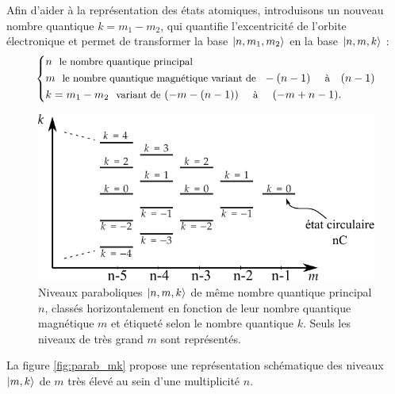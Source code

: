 Afin d'aider à la représentation des états atomiques, introduisons un nouveau nombre quantique $k=m_1-m_2$, qui quantifie l'excentricité de l'orbite électronique et permet de transformer la base $\ket{n,m_1,m_2}$ en la base $\ket{n,m,k}$ :
\begin{equation}\label{eq:base_nmk}
\left\{
\begin{aligned}
&n \text{ \begin{small}
le nombre quantique principal
\end{small}}\\
&m \text{ \begin{small}
le nombre quantique magnétique variant de
\end{small} }
-(n-1)~~ \text{ \begin{small} à \end{small}} ~~(n-1)\\
&k=m_1-m_2 \text{ \begin{small} variant de\end{small} } (-m-(n-1))~~ \text{ \begin{small} à \end{small} } ~~(-m+n-1).
\end{aligned} \right.
\end{equation}
%


\begin{figure}[!h]
\centering
\includegraphics[width=.7\linewidth]{figures/echelle_parabolique_mk}
\caption[Échelle des niveaux paraboliques $\ket{n,m,k}$]{
Niveaux paraboliques $\ket{n,m,k}$ de même nombre quantique principal $n$, classés horizontalement en fonction de leur nombre quantique magnétique $m$ et étiqueté selon le nombre quantique $k$.
Seuls les niveaux de très grand $m$ sont représentés.
}
\label{fig:parab_mk}
\end{figure}

\noindent La figure \eqref{fig:parab_mk} propose une représentation schématique des niveaux $\ket{m,k}$ de $m$ très élevé au sein d'une multiplicité $n$.

